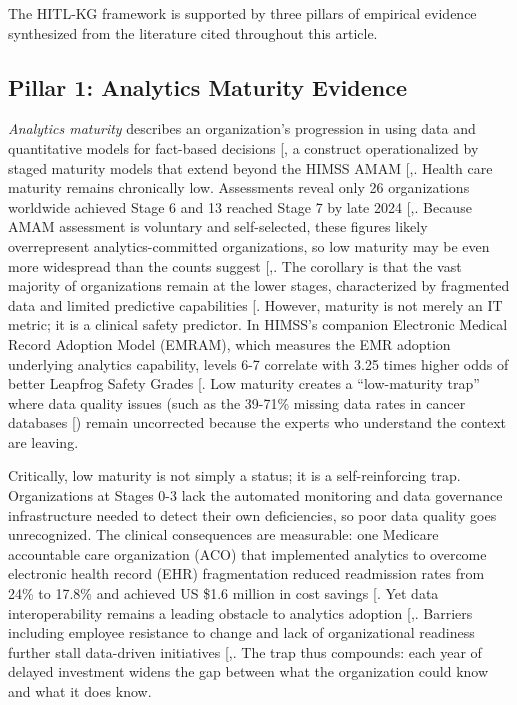 \documentclass[
  american,
  11pt,
  letterpaper,
  oneside  ,captions=tableheading
]{scrartcl}
\begin{document}
The HITL-KG framework is supported by three pillars of empirical
evidence synthesized from the literature cited throughout this article.

\subsection{Pillar 1: Analytics Maturity
Evidence}\label{pillar-1-analytics-maturity-evidence}

\emph{Analytics maturity} describes an organization's progression in
using data and quantitative models for fact-based decisions
{[}\citeproc{ref-davenport2007}{39}{]}, a construct operationalized by
staged maturity models that extend beyond the HIMSS AMAM
{[},\citeproc{ref-langer2025}{41}{]}.
Health care maturity remains chronically low. Assessments reveal only 26
organizations worldwide achieved Stage 6 and 13 reached Stage 7 by late
2024 {[},\citeproc{ref-himss2024news}{2}{]}.
Because AMAM assessment is voluntary and self-selected, these figures
likely overrepresent analytics-committed organizations, so low maturity
may be even more widespread than the counts suggest
{[},\citeproc{ref-tomaskovic1994}{43}{]}.
The corollary is that the vast majority of organizations remain at the
lower stages, characterized by fragmented data and limited predictive
capabilities {[}\citeproc{ref-health2020}{44}{]}. However, maturity is
not merely an IT metric; it is a clinical safety predictor. In HIMSS's
companion Electronic Medical Record Adoption Model (EMRAM), which
measures the EMR adoption underlying analytics capability, levels 6-7
correlate with 3.25 times higher odds of better Leapfrog Safety Grades
{[}\citeproc{ref-snowdon2024}{45}{]}. Low maturity creates a
``low-maturity trap'' where data quality issues (such as the 39-71\%
missing data rates in cancer databases
{[}\citeproc{ref-yang2021}{46}{]}) remain uncorrected because the
experts who understand the context are leaving.

Critically, low maturity is not simply a status; it is a
self-reinforcing trap. Organizations at Stages 0-3 lack the automated
monitoring and data governance infrastructure needed to detect their own
deficiencies, so poor data quality goes unrecognized. The clinical
consequences are measurable: one Medicare accountable care organization
(ACO) that implemented analytics to overcome electronic health record
(EHR) fragmentation reduced readmission rates from 24\% to 17.8\% and
achieved US \$1.6 million in cost savings
{[}\citeproc{ref-latrella2024}{47}{]}. Yet data interoperability remains
a leading obstacle to analytics adoption
{[},\citeproc{ref-zhang2024}{4}{]}. Barriers
including employee resistance to change and lack of organizational
readiness further stall data-driven initiatives
{[},\citeproc{ref-kamble2019}{49}{]}. The
trap thus compounds: each year of delayed investment widens the gap
between what the organization could know and what it does know.
\end{document}
